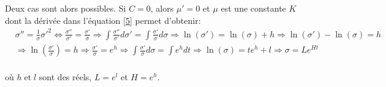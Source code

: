 \documentclass[11pt,french]{article}
\begin{document}
Deux cas sont alors possibles. Si $C=0$, alors $\mu'=0$ et $\mu$ est une constante $K$ dont la dérivée dans l'équation \eqref{5} permet d'obtenir:
\begin{align*}
    &\sigma''=\frac{1}{\sigma}\sigma'^2 \iff\frac{\sigma''}{\sigma'}=\frac{\sigma'}{\sigma}\Longrightarrow\int\frac{\sigma''}{\sigma'}d\sigma'=\int\frac{\sigma'}{\sigma}d\sigma\Longrightarrow\ln(\sigma')=\ln(\sigma)+h\Longrightarrow\ln(\sigma')-\ln(\sigma)=h\\
   &\Longrightarrow\ln(\frac{\sigma'}{\sigma})=h\Longrightarrow \frac{\sigma'}{\sigma}=e^h\Longrightarrow\int\frac{\sigma'}{\sigma}d\sigma=\int e^hdt\Longrightarrow\ln(\sigma)=te^h+l\Longrightarrow\sigma=Le^{Ht} 
\end{align*}\\
où $h\;\text{et}\;l$ sont des réels, $L=e^l$ et $H=e^h $.\\
\end{document}

